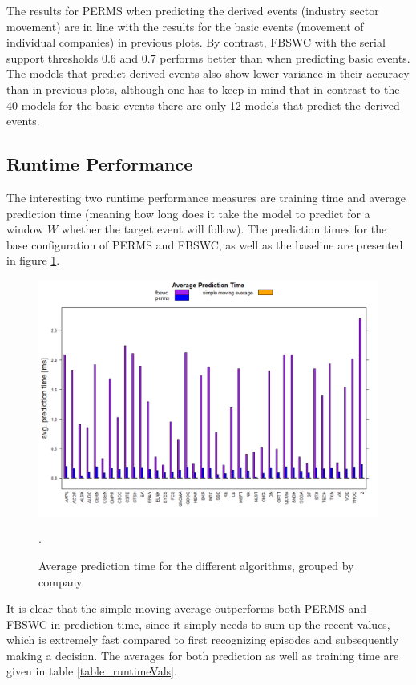 The results for PERMS when predicting the derived events (industry sector movement) are in line with the results for the basic events (movement of individual companies) in previous plots. By contrast, FBSWC with the serial support thresholds $0.6$ and $0.7$ performs better than when predicting basic events. The models that predict derived events also show lower variance in their accuracy than in previous plots, although one has to keep in mind that in contrast to the 40 models for the basic events there are only 12 models that predict the derived events.

\subsection{Runtime Performance}
The interesting two runtime performance measures are training time and average prediction time (meaning how long does it take the model to predict for a window $W$ whether the target event will follow). The prediction times for the base configuration of PERMS and FBSWC, as well as the baseline are presented in figure \ref{fig_runtimeBaseConfig}.

\begin{figure}
	\centering
  	\includegraphics[width=\textwidth]{runtimeBaseConfig}
	\caption{Average prediction time for the different algorithms, grouped by company.}.
	\label{fig_runtimeBaseConfig}
\end{figure}

It is clear that the simple moving average outperforms both PERMS and FBSWC in prediction time, since it simply needs to sum up the recent values, which is extremely fast compared to first recognizing episodes and subsequently making a decision. The averages for both prediction as well as training time are given in table \ref{table_runtimeVals}. 

